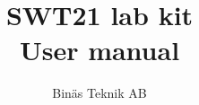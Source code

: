 \documentclass{article}[a4paper]
\title{SWT21 lab kit \\ User manual}
\author{Binäs Teknik AB}
\begin{document}
\maketitle
\tableofcontents
\newpage

\begin{comment}

Använd ESP32 som HIL. Lägg till ett hårdvarukrestkort? LP-filter för analog-ut? (resistorstege?)
CAN-kommunikation är svårt, möjligen två transceivrar mellan Teensy och ESP32.
UART-kommunikation, LIN?
Två ESP32 för att testa mot varandra resp. en ESP32 som HIL och testa av den andra. Kan även köra micropython.

Med jumpers får vi med att ha koll på hårdvarukonfiguration.


Vda kan vi vilja testa?



All command and responses are '\\n'-terminated.
<module> <command> [arguments]
Max length

Common commands:
config set <parameter> <value> ...
config get <parameter>

Responses
---------
OK [data]
ERR <reason>

ERR Invalid command

ADC commands
------------
ADC<n> off
ADC<n> single
ADC<n> periodic <period (us)> [offset (us)]
ADC<n> status                      - OK ADC<n> status: <off/single/periodic <period> <offset>>
ADC<n> config set raw
ADC<n> config get raw              - OK ADC<n> raw: [on/off]
ADC<n> config set range <low> <high>
ADC<n> config get range            - OK ADC<n> range: <low> <high>
ADC<n> config timestamp <off/on>

Unsolicited ADC commands
------------------------
ADC<n> value [timestamp] <value>

DAC commands
------------
DAC<n> voltage
DAC<n> raw
DAC<n> config set range <low> <high>
DAC<n> config get range <low> <high>
pwm?

UART commands
-------------
UART<n> send <length>
UART<n>
UART<n> config set baudrate <baudrate>
UART<n> config get baudrate
UART<n> config set format <format>     - e.g. 8n1
UART<n> config get format

UART config parameters
----------------------
baudrate - <baudrate int32>
format - <format string> <bits><n|o|p><1|2>, e.g. 8n1 for 8 bits, no parity and 1 stop bit

Unsolicited UART commands
-------------------------
UART<n> overrun error <n>
UART<n> underrun error <n>
UART<n> framing error <n>
UART<n> parity error <n>

\end{comment}
\end{document}
